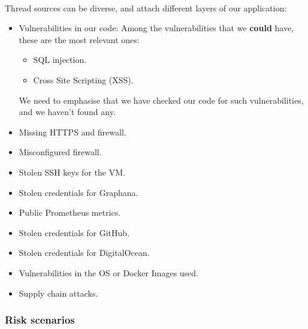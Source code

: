 \paragraph{} Thread sources can be diverse, and attach different layers of our application:
\begin{itemize}
	\item Vulnerabilities in our code: Among the vulnerabilities that we \textbf{could} have, these are the most relevant ones:
	      \begin{itemize}
		      \item SQL injection.
		      \item Cross Site Scripting (XSS).
	      \end{itemize}
	      We need to emphasise that we have checked our code for such vulnerabilities, and we haven't found any.
	\item Missing HTTPS and firewall.
	\item Misconfigured firewall.
	\item Stolen SSH keys for the VM.
	\item Stolen credentials for Graphana.
	\item Public Prometheus metrics.
	\item Stolen credentials for GitHub.
	\item Stolen credentials for DigitalOcean.
	\item Vulnerabilities in the OS or Docker Images used.
	\item Supply chain attacks.
\end{itemize}

\subsubsection{Risk scenarios}

